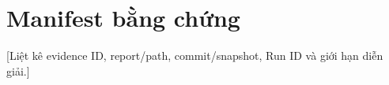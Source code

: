 \documentclass[12pt,a4paper,openany,oneside]{book}
\begin{document}
\frontmatter

\tableofcontents
\listoffigures
\listoftables
\mainmatter





\printbibliography[heading=bibintoc,title={Tài liệu tham khảo}]
\appendix
\chapter{Manifest bằng chứng}
[Liệt kê evidence ID, report/path, commit/snapshot, Run ID và giới hạn diễn giải.]
\end{document}
